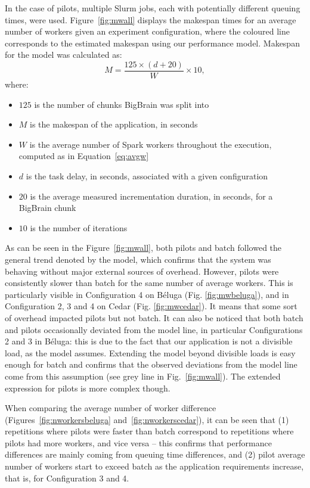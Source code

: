 \documentclass{IEEEtran}
\begin{document}
In the case of pilots, multiple Slurm jobs, each with potentially different queuing times,
were used. Figure~\ref{fig:mwall} displays the makespan times for an average number of workers
given an experiment configuration, where the coloured line corresponds to the estimated makespan using 
our performance model. Makespan for the model was calculated as:
$$
M = \frac{125\times(d + 20)}{W}\times 10,
$$
where:
\begin{itemize}
    \item $125$ is the number of chunks BigBrain was split into
    \item $M$ is the makespan of the application, in seconds
    \item $W$ is the average number of Spark workers throughout the execution, computed as in Equation~\ref{eq:avgw}
    \item $d$ is the task delay, in seconds, associated with a given configuration
    \item $20$ is the average measured incrementation duration, in seconds, for a BigBrain chunk
    \item $10$ is the number of iterations
\end{itemize}
As can be seen in the Figure~\ref{fig:mwall}, both pilots and batch 
followed the general trend denoted by the model, which confirms that 
the system was behaving without major external sources of
overhead. However, pilots were consistently slower than batch for the same
number of average workers. This is particularly visible in Configuration 4
on B\'eluga (Fig. \ref{fig:mwbeluga}), and in Configuration 2, 3 and 4 on
Cedar (Fig. \ref{fig:mwcedar}). It means that some sort of overhead
impacted pilots but not batch. It can also be noticed that both batch and
pilots occasionally deviated from the model line, in particular
Configurations 2 and 3 in B\'eluga: this is due to the fact that our
application is not a divisible load, as the model assumes. Extending the
model beyond divisible loads is easy enough for batch and confirms that the
observed deviations from the model line come from this assumption (see grey
line in Fig.~\ref{fig:mwall}). The extended expression for pilots is more complex
though.

When
comparing the average number of worker difference
(Figures~\ref{fig:nworkersbeluga} and~\ref{fig:nworkerscedar}), it can be
seen that (1) repetitions where pilots were faster than batch correspond
to repetitions where pilots had more workers, and vice versa -- this
confirms that performance differences are mainly coming from queuing time
differences, and (2) pilot average number of workers start to exceed batch
as the application requirements increase, that is, for Configuration 3 and
4.
\end{document}
